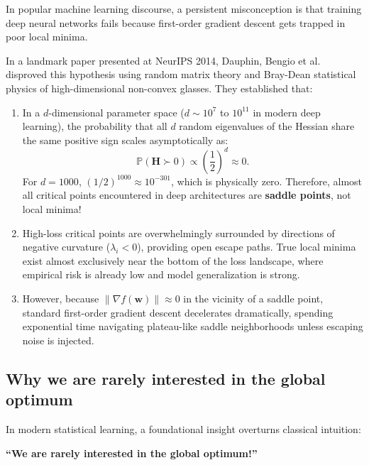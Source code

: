 In popular machine learning discourse, a persistent misconception is that training deep neural networks fails because first-order gradient descent gets trapped in poor local minima.

In a landmark paper presented at NeurIPS 2014, Dauphin, Bengio et al.~\cite{dauphin2014identifying} disproved this hypothesis using random matrix theory and Bray-Dean statistical physics of high-dimensional non-convex glasses. They established that:
\begin{enumerate}
  \item In a $d$-dimensional parameter space ($d \sim 10^7$ to $10^{11}$ in modern deep learning), the probability that all $d$ random eigenvalues of the Hessian share the same positive sign scales asymptotically as:
  \begin{equation}
  \mathbb{P}(\mathbf{H} \succ 0) \propto \left(\frac{1}{2}\right)^d \approx 0.
  \label{eq:saddle_point_probability}
  \end{equation}
  For $d = 1000$, $(1/2)^{1000} \approx 10^{-301}$, which is physically zero. Therefore, almost all critical points encountered in deep architectures are \textbf{saddle points}, not local minima!
  \item High-loss critical points are overwhelmingly surrounded by directions of negative curvature ($\lambda_i < 0$), providing open escape paths. True local minima exist almost exclusively near the bottom of the loss landscape, where empirical risk is already low and model generalization is strong.
  \item However, because $\|\nabla f(\mathbf{w})\| \approx 0$ in the vicinity of a saddle point, standard first-order gradient descent decelerates dramatically, spending exponential time navigating plateau-like saddle neighborhoods unless escaping noise is injected.
\end{enumerate}

\subsection{Why we are rarely interested in the global optimum}
\label{sec:global_optimum_fallacy}

In modern statistical learning, a foundational insight overturns classical intuition:
\begin{center}
\textbf{\Large\color{politoNavy} ``We are rarely interested in the global optimum!''}
\end{center}

